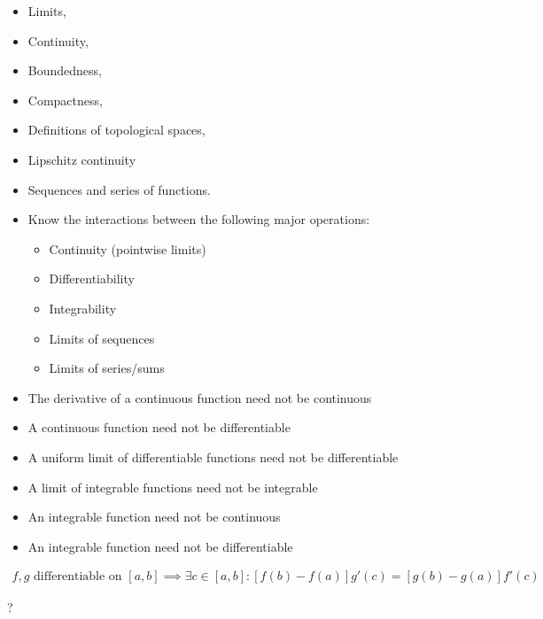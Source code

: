 \begin{itemize}
\item
  Limits,
\item
  Continuity,
\item
  Boundedness,
\item
  Compactness,
\item
  Definitions of topological spaces,
\item
  Lipschitz continuity
\item
  Sequences and series of functions.
\item
  Know the interactions between the following major operations:

  \begin{itemize}
  \tightlist
  \item
    Continuity (pointwise limits)
  \item
    Differentiability
  \item
    Integrability
  \item
    Limits of sequences
  \item
    Limits of series/sums
  \end{itemize}
\item
  The derivative of a continuous function need not be continuous
\item
  A continuous function need not be differentiable
\item
  A uniform limit of differentiable functions need not be differentiable
\item
  A limit of integrable functions need not be integrable
\item
  An integrable function need not be continuous
\item
  An integrable function need not be differentiable
\end{itemize}

\begin{theorem}

\begin{align*}
f,g\text{ differentiable on } [a,b] \implies \exists c\in[a,b] :
\left[f ( b ) - f ( a ) \right] g' ( c ) = \left[g ( b ) - g ( a )\right] f' ( c )
\end{align*}

\end{theorem}

\begin{corollary}

? 

\end{corollary}

